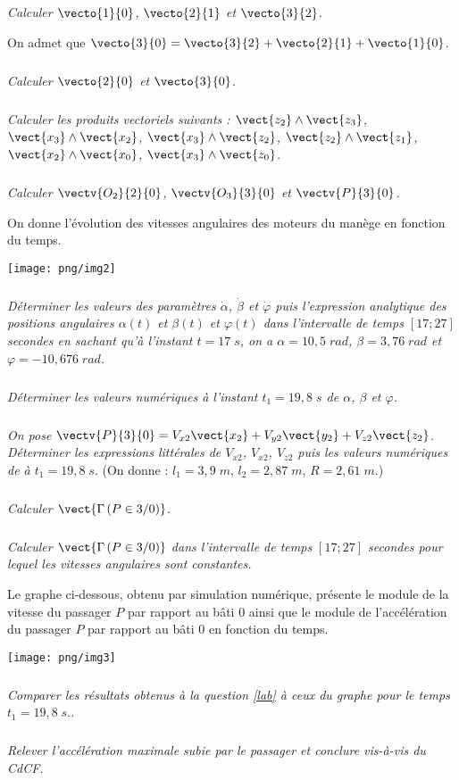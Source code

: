 \documentclass[10pt,oneside]{article}
\begin{document}
\subparagraph{}
\textit{Calculer $\vecto{1}{0}$, $\vecto{2}{1}$ et $\vecto{3}{2}$.}

\vspace{.3cm}

On admet que $\vecto{3}{0}=\vecto{3}{2}+\vecto{2}{1}+\vecto{1}{0}$.

\subparagraph{}
\textit{Calculer $\vecto{2}{0}$ et $\vecto{3}{0}$.}

\subparagraph{}
\textit{Calculer les produits vectoriels suivants : $\vect{z_2}\wedge\vect{z_3}$,
$\vect{x_3}\wedge\vect{x_2}$, $\vect{x_3}\wedge\vect{z_2}$,
$\vect{z_2}\wedge\vect{z_1}$, $\vect{x_2}\wedge\vect{x_0}$,
$\vect{x_3}\wedge\vect{z_0}$.}


\subparagraph{}
\textit{Calculer $\vectv{O_2}{2}{0}$, $\vectv{O_3}{3}{0}$ et $\vectv{P}{3}{0}$.}

\vspace{.3cm}

On donne l'évolution des vitesses angulaires des moteurs du manège en fonction du temps.
\begin{center}
\texttt{[image: png/img2]}
\end{center}

\subparagraph{\label{lab}}
\textit{Déterminer les valeurs des paramètres $\dot{\alpha}$, $\dot{\beta}$ et $\dot{\varphi}$
puis l'expression analytique des positions angulaires $\alpha(t)$ et $\beta(t)$ et $\varphi(t)$ dans l'intervalle de temps $[17;27]$ secondes en sachant qu'à l'instant $t=17\;s$, on a $\alpha=10,5\; rad$, $\beta=3,76\; rad$ et $\varphi=-10,676\; rad$.}

\subparagraph{}
\textit{Déterminer les valeurs numériques à l'instant $t_1=19,8\; s$ de $\alpha$, $\beta$ et $\varphi$.}

\subparagraph{}
\textit{On pose $\vectv{P}{3}{0}=V_{x2}\vect{x_2}+V_{y2}\vect{y_2}+V_{z2}\vect{z_2}$. Déterminer les expressions littérales de $V_{x2}$, $V_{x2}$, $V_{z2}$ puis les valeurs numériques de à $t_1=19,8\;s.$} (On donne : $l_1=3,9\;m$, $l_2=2,87\;m$, $R=2,61\;m$.)

\subparagraph{}
\textit{Calculer $\vect{\Gamma\left(P\in3/0 \right)}$.}

\subparagraph{}
\textit{Calculer $\vect{\Gamma\left(P\in3/0 \right)}$ dans l'intervalle de temps $[17;27]$ secondes pour lequel les vitesses angulaires sont constantes.}

\vspace{.3cm}

Le graphe ci-dessous, obtenu par simulation numérique, présente le module de la vitesse du passager $P$ par rapport au bâti 0 ainsi que le module de l'accélération du passager $P$ par rapport au bâti 0 en fonction du temps. 
\begin{center}
\texttt{[image: png/img3]}
\end{center}

\subparagraph{}
\textit{Comparer les résultats obtenus à la question \ref{lab} à ceux du graphe pour le temps $t_1=19,8\;s.$.}

\subparagraph{}
\textit{Relever l'accélération maximale subie par le passager et conclure vis-à-vis du CdCF.}
\end{document}
